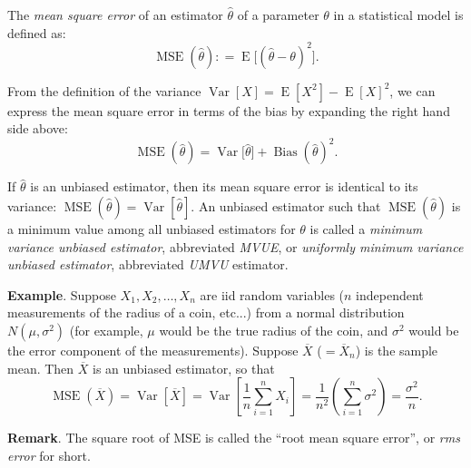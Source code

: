 \documentclass[12pt]{article}
\begin{document}
The \emph{mean square error} of an estimator $\hat{\theta}$ of a
parameter $\theta$ in a statistical model is defined as:
$$\operatorname{MSE}(\hat{\theta})\colon=\operatorname{E}\big[(\hat{\theta}-\theta)^2\big].$$

From the definition of the variance
$\operatorname{Var}[X]=\operatorname{E}[X^2]-\operatorname{E}[X]^2$,
we can express the mean square error in terms of the bias by
expanding the right hand side above:
$$\operatorname{MSE}(\hat{\theta})=\operatorname{Var}\big[\hat{\theta}\big]+
\operatorname{Bias}(\hat{\theta})^2.$$

If $\hat{\theta}$ is an unbiased estimator, then its mean square
error is identical to its variance:
$\operatorname{MSE}(\hat{\theta})=\operatorname{Var}[\hat{\theta}]$.
An unbiased estimator such that $\operatorname{MSE}(\hat{\theta})$
is a minimum value among all unbiased estimators for $\theta$ is
called a \emph{minimum variance unbiased estimator}, abbreviated \emph{MVUE}, or \emph{uniformly minimum variance unbiased estimator}, abbreviated \emph{UMVU} estimator.

\textbf{Example}.  Suppose $X_1,X_2,\ldots,X_n$ are iid random
variables ($n$ independent measurements of the radius of a coin,
etc...) from a normal distribution $N(\mu,\sigma^2)$ (for example,
$\mu$ would be the true radius of the coin, and $\sigma^2$ would be
the error component of the measurements).  Suppose $\overline{X}$
($=\overline{X}_n$) is the sample mean.  Then $\overline{X}$ is an
unbiased estimator, so that
$$\operatorname{MSE}(\overline{X})=\operatorname{Var}\left[\overline{X}\right]=
\operatorname{Var}\left[\frac{1}{n}\sum_{i=1}^n
X_i\right]=\frac{1}{n^2}\left(\sum_{i=1}^n \sigma^2\right)=\frac{\sigma^2}{n}.$$

\textbf{Remark}.  The square root of MSE is called the ``root mean square error'', or \emph{rms error} for short.
\end{document}
